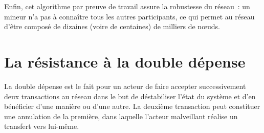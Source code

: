 Enfin, cet algorithme par preuve de travail assure la robustesse du réseau~: un mineur n'a pas à connaître tous les autres participants, ce qui permet au réseau d'être composé de dizaines (voire de centaines) de milliers de nœuds.

\vspace{-1em}
\section*{La résistance à la double dépense}

La double dépense est le fait pour un acteur de faire accepter successivement deux transactions au réseau dans le but de déstabiliser l'état du système et d'en bénéficier d'une manière ou d'une autre. La deuxième transaction peut constituer une annulation de la première, dans laquelle l'acteur malveillant réalise un transfert vers lui-même.

